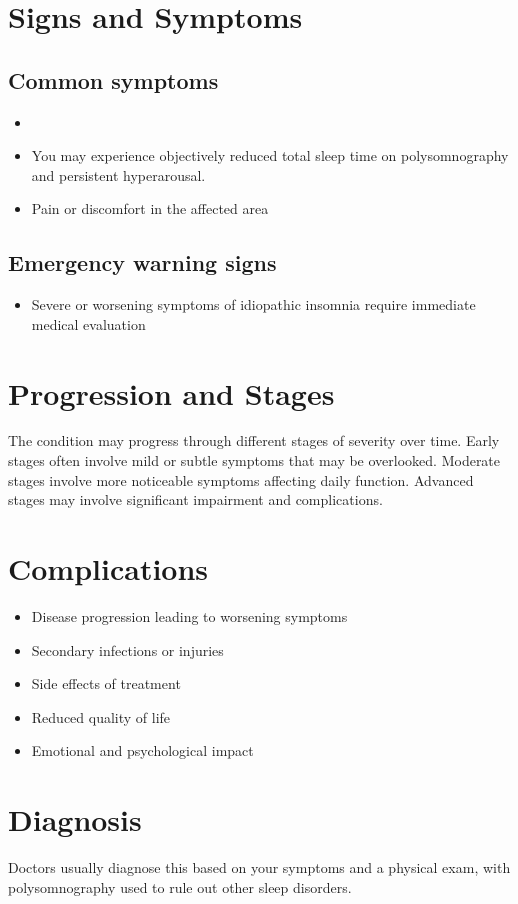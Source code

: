 \section{Signs and Symptoms}
\subsection{Common symptoms}
\begin{itemize}[noitemsep]
  \item \item You may experience objectively reduced total sleep time on polysomnography and persistent hyperarousal.
  \item Pain or discomfort in the affected area
  \end{itemize}
\subsection{Emergency warning signs}
\begin{itemize}[noitemsep]
  \item Severe or worsening symptoms of idiopathic insomnia require immediate medical evaluation
\end{itemize}
\section{Progression and Stages}
The condition may progress through different stages of severity over time. Early stages often involve mild or subtle symptoms that may be overlooked. Moderate stages involve more noticeable symptoms affecting daily function. Advanced stages may involve significant impairment and complications.
\section{Complications}
\begin{itemize}[noitemsep]
  \item Disease progression leading to worsening symptoms
  \item Secondary infections or injuries
  \item Side effects of treatment
  \item Reduced quality of life
  \item Emotional and psychological impact
\end{itemize}
\section{Diagnosis}
Doctors usually diagnose this based on your symptoms and a physical exam, with polysomnography used to rule out other sleep disorders.


